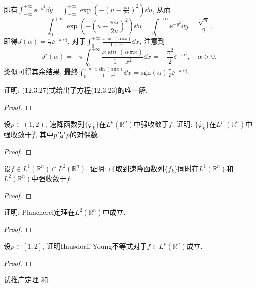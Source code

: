 \begin{quizb}
\begin{solution}
\[\begin{split}
		\end{split}\]即有\(	\int_{-\infty}^{+\infty}\ee^{-y^2}\dd y=\int_{-\infty}^{+\infty}\exp\left(-\left(u-\frac{\pi\alpha}{2u}\right)^2\right)\dd u\), 从而\[\int_{0}^{+\infty}\exp\left(-\left(u-\frac{\pi\alpha}{2u}\right)^2\right)\dd u=\int_{0}^{+\infty}\ee^{-y^2}\dd y=\frac{\sqrt{\pi}}{2},\]
	即得\(J(\alpha)=\frac{\pi}{2}\ee^{-\pi|\alpha|}\). 对于\(\int_{0}^{+\infty}\frac{x\sin\left(\alpha\pi x\right)}{1+x^2}\dd x\), 注意到\[J'(\alpha)=-\pi\int_{0}^{+\infty}\frac{x\sin(\alpha\pi x)}{1+x^2}\dd x=-\frac{\pi^2}{2}\ee^{-\pi\alpha},\quad \alpha>0,\]类似可得其余结果, 最终\(\int_{0}^{+\infty}\frac{x\sin\left(\alpha\pi x\right)}{1+x^2}\dd x=\mathrm{sgn}(\alpha)\frac{\pi}{2}\ee^{-\pi|\alpha|}\).
\end{solution}
\woe 证明: (12.3.27)式给出了方程(12.3.23)的唯一解.
\begin{proof}
	
\end{proof}
\woe 设\(p\in(1,2)\), 速降函数列\(\{\varphi_k\}\)在\(L^p\left(\mathbb{R}^n\right)\)中强收敛于\(f\). 证明: \(\{\widehat{\varphi}_k\}\)在\(L^{p'}(\mathbb{R}^n)\)中强收敛于\(\widehat{f}\), 其中\(p'\)是\(p\)的对偶数.
\begin{proof}
	
\end{proof}
\woe 设\(f\in L^1(\mathbb{R}^n)\cap L^2(\mathbb{R}^n)\). 证明: 可取到速降函数列\(\{f_k\}\)同时在\(L^1(\mathbb{R}^n)\)和\(L^2(\mathbb{R}^n)\)中强收敛于\(f\).
\begin{proof}
	
\end{proof}
\woe 证明: Plancherel定理在\(L^2(\mathbb{R}^n)\)中成立.
\begin{proof}
	
\end{proof}
\woe 设\(p\in[1,2]\), 证明Hausdorff-Young不等式对于\(f\in L^p\left(\mathbb{R}^n\right)\)成立.
\begin{proof}
	
\end{proof}
\woe 试推广定理 和.
\begin{solution}
	
\end{solution}
\end{quizb}
